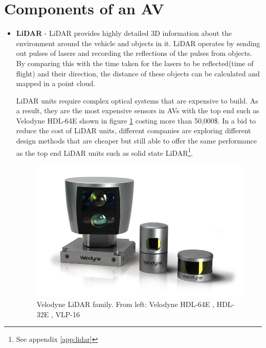 
\section{Components of an AV}

\begin{itemize}
	\item \textbf{LiDAR} - LiDAR provides highly detailed 3D information about the environment around the vehicle and objects in it. LiDAR operates by sending out pulses of lasers and recording the reflections of the pulses from objects. By comparing this with the time taken for the lasers to be reflected(time of flight) and their direction, the distance of these objects can be calculated and mapped in a point cloud. 

	LiDAR units require complex optical systems that are expensive to build. As a result,  they are the most expensive sensors in AVs with the top end such as Velodyne HDL-64E shown in figure \ref{fig:lidar} costing more than 50,000\$. 
	In a bid to reduce the cost of LiDAR units,  different companies are exploring different design methods that are cheaper but still able to offer the same performance as the top end LiDAR units such as solid state LiDAR\footnote{See appendix \ref{app:lidar}}.
	
	 \begin{figure}[h]
	 	\centering
	 	\includegraphics[width=\textwidth]{media/hdl-family.png}
	 	\caption{Velodyne LiDAR family. From left: Velodyne HDL-64E , HDL-32E , VLP-16}
	 	\label{fig:lidar}
	 \end{figure}
	

\end{itemize}
